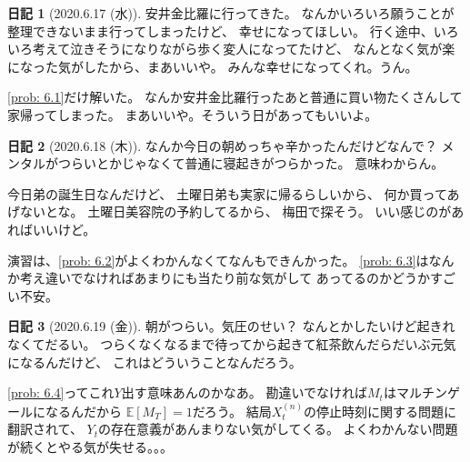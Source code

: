 \documentclass[uplatex]{jsarticle}
\theoremstyle{definition}
\newtheorem*{nikki*}{日記}
\def\E{\mathbb{E}}
\begin{document}
\begin{nikki*}[2020.6.17 (水)]
  安井金比羅に行ってきた。
  なんかいろいろ願うことが整理できないまま行ってしまったけど、
  幸せになってほしい。
  行く途中、いろいろ考えて泣きそうになりながら歩く変人になってたけど、
  なんとなく気が楽になった気がしたから、まあいいや。
  みんな幸せになってくれ。うん。

  \autoref{prob: 6.1}だけ解いた。
  なんか安井金比羅行ったあと普通に買い物たくさんして家帰ってしまった。
  まあいいや。そういう日があってもいいよ。
\end{nikki*}

\begin{nikki*}[2020.6.18 (木)]
  なんか今日の朝めっちゃ辛かったんだけどなんで？
  メンタルがつらいとかじゃなくて普通に寝起きがつらかった。
  意味わからん。

  今日弟の誕生日なんだけど、
  土曜日弟も実家に帰るらしいから、
  何か買ってあげないとな。
  土曜日美容院の予約してるから、
  梅田で探そう。
  いい感じのがあればいいけど。

  演習は、\autoref{prob: 6.2}がよくわかんなくてなんもできんかった。
  \autoref{prob: 6.3}はなんか考え違いでなければあまりにも当たり前な気がして
  あってるのかどうかすごい不安。
\end{nikki*}


\begin{nikki*}[2020.6.19 (金)]
  朝がつらい。気圧のせい？
  なんとかしたいけど起きれなくてだるい。
  つらくなくなるまで待ってから起きて紅茶飲んだらだいぶ元気になるんだけど、
  これはどういうことなんだろう。

  \autoref{prob: 6.4}ってこれ\(Y\)出す意味あんのかなあ。
  勘違いでなければ\(M_t\)はマルチンゲールになるんだから
  \(\E[M_T]=1\)だろう。
  結局\(X_t^{(n)}\)の停止時刻に関する問題に翻訳されて、
  \(Y_t\)の存在意義があんまりない気がしてくる。
  よくわかんない問題が続くとやる気が失せる。。。
\end{nikki*}
\end{document}
